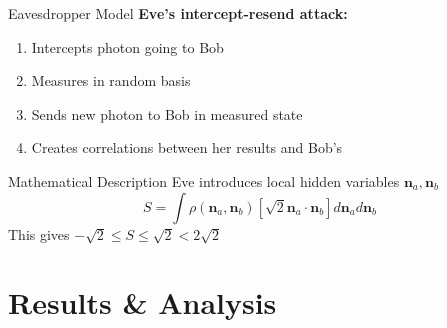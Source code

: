 \documentclass[10pt]{beamer}
\begin{document}
\begin{frame}{Eavesdropper Model}
    \textbf{Eve's intercept-resend attack:}
    \begin{enumerate}
        \item Intercepts photon going to Bob
        \item Measures in random basis
        \item Sends new photon to Bob in measured state
        \item Creates correlations between her results and Bob's
    \end{enumerate}
    
    \vspace{5mm}
    \begin{block}{Mathematical Description}
        Eve introduces local hidden variables $\mathbf{n}_a, \mathbf{n}_b$
        \begin{equation*}
            S = \int \rho(\mathbf{n}_a,\mathbf{n}_b) [\sqrt{2}\mathbf{n}_a\cdot\mathbf{n}_b] d\mathbf{n}_a d\mathbf{n}_b
        \end{equation*}
        This gives $-\sqrt{2} \leq S \leq \sqrt{2} < 2\sqrt{2}$
    \end{block}
\end{frame}

\section{Results \& Analysis}
\end{document}
